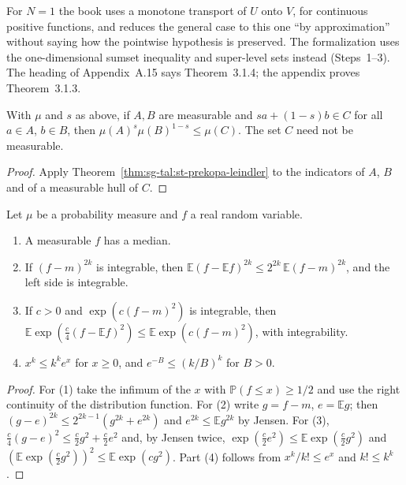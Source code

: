 \begin{remark}\label{rem:sg-tal:st-prekopa-method}
For $N=1$ the book uses a monotone transport of $U$ onto $V$, for continuous positive functions,
and reduces the general case to this one ``by approximation'' without saying how the pointwise
hypothesis is preserved. The formalization uses the one-dimensional sumset inequality and super-level sets instead (Steps~1--3). The
heading of Appendix~A.15 says Theorem~3.1.4; the appendix proves Theorem~3.1.3.
\end{remark}

\begin{corollary}\label{cor:sg-tal:st-brunn-minkowski}
  \leanok
With $\mu$ and $s$ as above, if $A,B$ are measurable and $sa+(1-s)b\in C$ for all $a\in A$, $b\in B$, then
$\mu(A)^s\mu(B)^{1-s}\le\mu(C)$. The set $C$ need not be measurable.
\end{corollary}
\begin{proof}
  \leanok
Apply Theorem~\ref{thm:sg-tal:st-prekopa-leindler} to the indicators of $A$, $B$ and of a measurable
hull of $C$.
\end{proof}

\begin{lemma}\label{lem:sg-tal:st-centering}
  \leanok
{}
Let $\mu$ be a probability measure and $f$ a real random variable.
\begin{enumerate}
\item A measurable $f$ has a median.
\item If $(f-m)^{2k}$ is integrable, then
$\mathbb E(f-\mathbb Ef)^{2k}\le2^{2k}\,\mathbb E(f-m)^{2k}$, and the left side is integrable.
\item If $c>0$ and $\exp(c(f-m)^2)$ is integrable, then
$\mathbb E\exp(\frac c4(f-\mathbb Ef)^2)\le\mathbb E\exp(c(f-m)^2)$, with integrability.
\item $x^k\le k^k e^x$ for $x\ge0$, and $e^{-B}\le(k/B)^k$ for $B>0$.
\end{enumerate}
\end{lemma}
\begin{proof}
  \leanok
For (1) take the infimum of the $x$ with $\mathbb P(f\le x)\ge1/2$ and use the right continuity of the
distribution function. For (2) write $g=f-m$, $e=\mathbb Eg$; then $(g-e)^{2k}\le2^{2k-1}(g^{2k}+e^{2k})$
and $e^{2k}\le\mathbb Eg^{2k}$ by Jensen. For (3), $\frac c4(g-e)^2\le\frac c2g^2+\frac c2e^2$ and, by Jensen
twice, $\exp(\frac c2e^2)\le\mathbb E\exp(\frac c2g^2)$ and
$(\mathbb E\exp(\frac c2g^2))^2\le\mathbb E\exp(cg^2)$. Part (4) follows from $x^k/k!\le e^x$ and $k!\le k^k$.
\end{proof}

